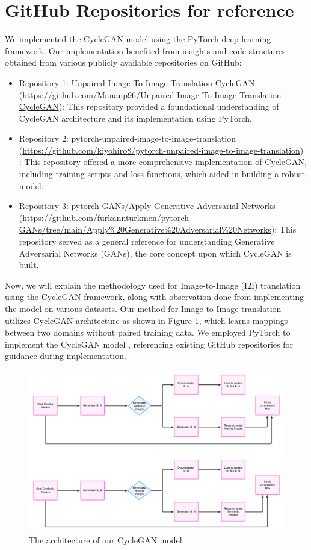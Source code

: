 \documentclass[UKenglish,12pt]{master-style}
\begin{document}
\section*{GitHub Repositories for reference}

We implemented the CycleGAN model using the PyTorch deep learning framework. Our implementation benefited from insights and code structures obtained from various publicly available repositories on GitHub:
\begin{itemize}
\item Repository 1: Unpaired-Image-To-Image-Translation-CycleGAN (\url{https://github.com/Mananp96/Unpaired-Image-To-Image-Translation-CycleGAN}): This repository provided a foundational understanding of CycleGAN architecture and its implementation using PyTorch.
\item Repository 2: pytorch-unpaired-image-to-image-translation (\url{https://github.com/kiyohiro8/pytorch-unpaired-image-to-image-translation}) : This repository offered a more comprehensive implementation of CycleGAN, including training scripts and loss functions, which aided in building a robust model.
\item Repository 3: pytorch-GANs/Apply Generative Adversarial Networks (\url{https://github.com/furkannturkmen/pytorch-GANs/tree/main/Apply%20Generative%20Adversarial%20Networks}):  This repository served as a general reference for understanding Generative Adversarial Networks (GANs), the core concept upon which CycleGAN is built.
\end{itemize}

Now, we will explain the methodology used for Image-to-Image (I2I) translation using the CycleGAN framework, along with observation done from implementing the model on various datasets. Our method for Image-to-Image translation utilizes CycleGAN architecture as shown in Figure \ref{fig:Cyclegan_Flowchart}, which learns mappings between two domains without paired training data. We employed PyTorch to implement the CycleGAN model \cite{CycleGAN}, referencing existing GitHub repositories for guidance during implementation.

\begin{figure}[htbp]
    \centering
    \includegraphics[width=1\textwidth]{Images/Cyclegan_Flowchart.png}
    \caption{The architecture of our CycleGAN model}
    \label{fig:Cyclegan_Flowchart}
\end{figure}
\end{document}
